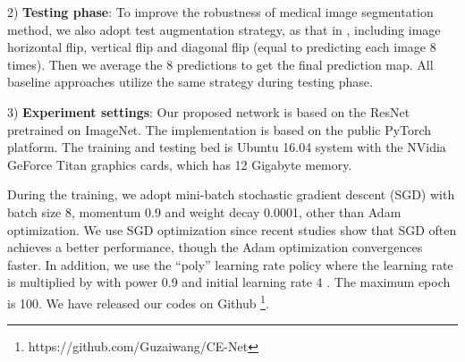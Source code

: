 \documentclass[journal]{IEEEtran}
\begin{document}
2) \textbf{Testing phase}: To improve the robustness of medical image segmentation method, we also adopt test augmentation strategy, as that in \cite{dai2016r, zhang2018fully}, including image horizontal flip, vertical flip and diagonal flip (equal to predicting each image 8 times). Then we average the 8 predictions to get the final prediction map. All baseline approaches utilize the same strategy during testing phase.

3) \textbf{Experiment settings}:  
Our proposed network is based on the ResNet pretrained on ImageNet. The implementation is based on the public PyTorch platform. The training and testing bed is Ubuntu 16.04 system with the NVidia GeForce Titan graphics cards, which has 12 Gigabyte  memory.

During the  training, we adopt mini-batch stochastic gradient descent (SGD) with batch size 8, momentum 0.9 and weight decay 0.0001, other than Adam optimization. We use SGD optimization since recent studies \cite{wilson2017marginal} \cite{keskar2017improving} show that SGD often achieves a better performance, though the Adam optimization convergences faster. In addition, we use the “poly” learning rate policy where the learning rate is multiplied by   with power 0.9 and  
initial learning rate 4 \cite{zhao2017pyramid}. The maximum epoch is 100. We have released our codes on Github \footnote{https://github.com/Guzaiwang/CE-Net}.
\end{document}
